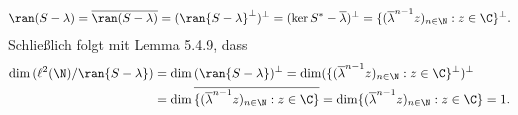 \begin{solution}
\begin{enumerate}[label = (\alph*)]
\begin{align*}
    \ran(S - \lambda) = \overline{\ran(S - \lambda)} = (\ran{S - \lambda}^{\bot})^{\bot}
    = (\ker{S^* - \overline{\lambda}})^{\bot} = \{(\overline{\lambda}^{n-1} z)_{n \in \N}: z \in \C\}^{\bot}.
  \end{align*}
  Schließlich folgt mit Lemma 5.4.9, dass
  \begin{align*}
    \dim{(\ell^2(\N) / \ran{S - \lambda})} &= \dim{(\ran{S - \lambda})^{\bot}}
    = \dim(\{(\overline{\lambda}^{n-1} z)_{n \in \N}: z \in \C\}^{\bot})^{\bot} \\
    &= \dim\overline{\{(\overline{\lambda}^{n-1} z)_{n \in \N}: z \in \C\}} 
    = \dim\{(\overline{\lambda}^{n-1} z)_{n \in \N}: z \in \C\} = 1.
  \end{align*}
\end{enumerate}
\end{solution}
